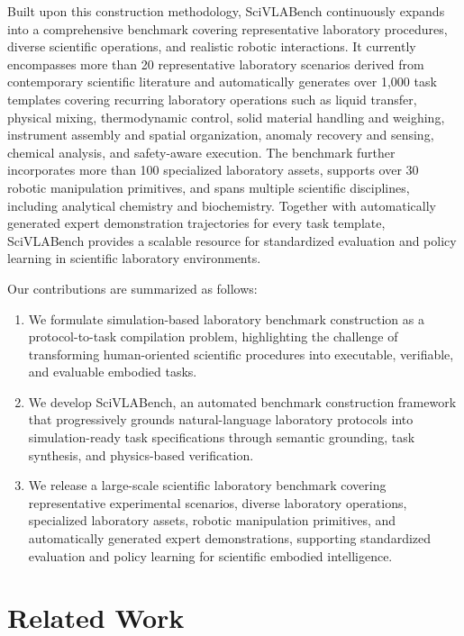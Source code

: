 \documentclass[sigconf]{acmart}
\begin{document}
Built upon this construction methodology, SciVLABench continuously expands into a comprehensive benchmark covering representative laboratory procedures, diverse scientific operations, and realistic robotic interactions. It currently encompasses more than 20 representative laboratory scenarios derived from contemporary scientific literature and automatically generates over 1,000 task templates covering recurring laboratory operations such as liquid transfer, physical mixing, thermodynamic control, solid material handling and weighing, instrument assembly and spatial organization, anomaly recovery and sensing, chemical analysis, and safety-aware execution. The benchmark further incorporates more than 100 specialized laboratory assets, supports over 30 robotic manipulation primitives, and spans multiple scientific disciplines, including analytical chemistry and biochemistry. Together with automatically generated expert demonstration trajectories for every task template, SciVLABench provides a scalable resource for standardized evaluation and policy learning in scientific laboratory environments.

Our contributions are summarized as follows:

\begin{enumerate}
\item We formulate simulation-based laboratory benchmark construction as a protocol-to-task compilation problem, highlighting the challenge of transforming human-oriented scientific procedures into executable, verifiable, and evaluable embodied tasks.
\item We develop SciVLABench, an automated benchmark construction framework that progressively grounds natural-language laboratory protocols into simulation-ready task specifications through semantic grounding, task synthesis, and physics-based verification.
\item We release a large-scale scientific laboratory benchmark covering representative experimental scenarios, diverse laboratory operations, specialized laboratory assets, robotic manipulation primitives, and automatically generated expert demonstrations, supporting standardized evaluation and policy learning for scientific embodied intelligence.
\end{enumerate}


\section{Related Work}
\label{sec:related-work}
\end{document}
